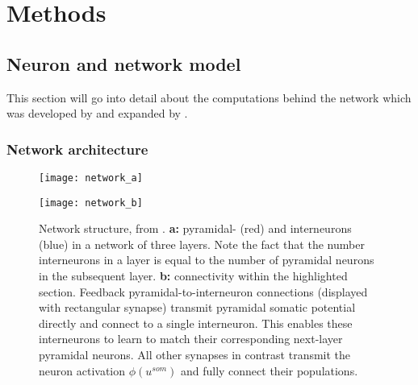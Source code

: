 
\chapter{Methods}




\section{Neuron and network model}

This section will go into detail about the computations behind the network which was developed by
\cite{sacramento2018dendritic} and expanded by \cite{Haider2021}.


\subsection{Network architecture}

\begin{figure}
  \centering
  \begin{minipage}{0.5\textwidth}
    \centering
    \texttt{[image: network\_a]}
  \end{minipage}\hfill
  \begin{minipage}{0.4\textwidth}
    \centering
    \texttt{[image: network\_b]}
  \end{minipage}
  \caption{Network structure, from \cite{Haider2021}. \textbf{a:} pyramidal- (red) and interneurons (blue) in a network
    of three layers. Note the fact that the number interneurons in a layer is equal to the number of pyramidal neurons
    in the subsequent layer\protect\footnotemark. \textbf{b:} connectivity within the highlighted section. Feedback
    pyramidal-to-interneuron connections (displayed with rectangular synapse) transmit pyramidal somatic potential
    directly and connect to a single interneuron. This enables these interneurons to learn to match their corresponding
    next-layer pyramidal neurons. All other synapses in contrast transmit the neuron activation $\phi (u^{som})$ and
    fully connect their populations.}
  \label{fig-network}
\end{figure}


